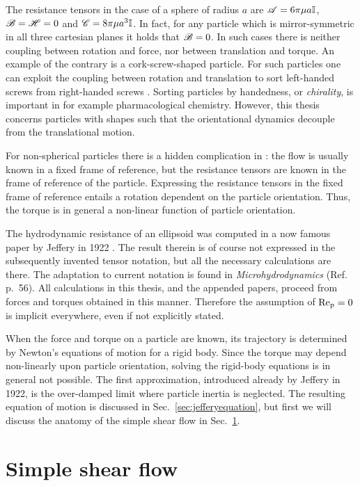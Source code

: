 \documentclass[thesis.tex]{subfiles}
\begin{document}
The resistance tensors in the case of a sphere of radius $a$ are  $\mathscr{A} = 6\pi\mu a \mathbb{I}$, $\mathscr{B}=\mathscr{H} = 0$ and $\mathscr{C} = 8\pi\mu a^3 \mathbb{I}$. In fact, for any particle which is mirror-symmetric in all three cartesian planes it holds that $\mathscr{B} = 0$. In such cases there is neither coupling between rotation and force, nor between translation and torque. An example of the contrary is a cork-screw-shaped particle. For such particles one can exploit the coupling between rotation and translation to sort left-handed screws from right-handed screws \cite{eichhorn2010,aristov2013}. Sorting particles by handedness, or \emph{chirality}, is important in for example pharmacological chemistry. However, this thesis concerns particles with shapes such that the orientational dynamics decouple from the translational motion.

For non-spherical particles there is a hidden complication in : the flow is usually known in a fixed frame of reference, but the resistance tensors are known in the frame of reference of the particle. Expressing the resistance tensors in the fixed frame of reference entails a rotation dependent on the particle orientation. Thus, the torque is in general a non-linear function of particle orientation.

The hydrodynamic resistance of an ellipsoid was computed in a now famous paper by Jeffery in 1922 \cite{jeffery1922}. The result therein is of course not expressed in the subsequently invented tensor notation, but all the necessary calculations are there. The adaptation to current notation is found in \emph{Microhydrodynamics} (Ref.~ p.~56). All calculations in this thesis, and the appended papers, proceed from forces and torques obtained in this manner. Therefore the assumption of $\mbox{Re}_{\mathrm p} = 0$ is implicit everywhere, even if not explicitly stated.

When the force and torque on a particle are known, its trajectory is determined by Newton's equations of motion for a rigid body. Since the torque may depend non-linearly upon particle orientation, solving the rigid-body equations is in general not possible. The first approximation, introduced already by Jeffery in 1922, is the over-damped limit where particle inertia is neglected. The resulting equation of motion is discussed in Sec.~\ref{sec:jefferyequation}, but first we will discuss the anatomy of the simple shear flow in Sec.~\ref{sec:shearflow}.

\section{Simple shear flow}\label{sec:shearflow}
\end{document}
